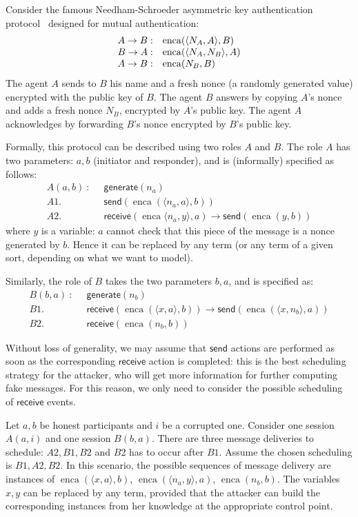 \documentclass[acmtocl,acmnow]{acmtrans2m}
\newcommand{\pair}[2]{\langle{#1},{#2}\rangle}
\newcommand{\enca}{\operatorname{enca}}
\newcommand{\pub}[1]{#1}
\newcommand{\new}{\mathsf{generate}}
\newcommand{\send}{\mathsf{send}}
\newcommand{\recv}{\mathsf{receive}}
\begin{document}
\begin{example}\label{ex:ns}
Consider the famous Needham-Schroeder asymmetric key
authentication protocol~\cite{NS78} designed for mutual authentication:
\[
\begin{array}{r@{\quad}l}
A\rightarrow B: & \enca(\pair{N_A}{A},\pub{B})\\
B\rightarrow A: & \enca(\pair{N_A}{N_B},\pub{A})\\
A\rightarrow B: & \enca(N_B,\pub{B})
\end{array}
\]
The agent $A$ sends to $B$ his name and a fresh nonce (a randomly generated value) encrypted with the public
key of $B$. The agent $B$ answers by copying $A$'s nonce and adds a fresh nonce $N_B$, encrypted by $A$'s
public key. The agent $A$ acknowledges by forwarding $B$'s nonce encrypted by $B$'s public key. 

Formally, this protocol can be described using two roles $A$ and $B$.
The role $A$ has two parameters: $a,b$ (initiator and responder), and
is (informally) specified as follows:
\[
\begin{array}{rl}
A(a,b)\: :\;\; & \new(n_a)\\
A1. & \send(\enca(\pair{n_a}{a},\pub{b}))\\
A2. & \recv(\enca{\pair{n_a}{y}},\pub{a}) \rightarrow \send(\enca(y,\pub{b}))
\end{array}
\]
where $y$ is a variable: $a$ cannot check that this piece of the message is
a nonce generated by $b$. Hence it can be replaced by any term (or any term
of a given sort, depending on what we want to model). 

Similarly, the role of $B$ takes the two parameters $b,a$, and is specified as:
\[
\begin{array}{rl}
B(b,a)\: :\;\; & \new(n_b)\\
B1.& \recv(\enca(\pair{x}{a},\pub{b})) \rightarrow \send(\enca(\pair{x}{n_b},\pub{a}))\\
B2. & \recv(\enca(n_b,\pub{b}))
\end{array}
\]






Without loss of generality, we may assume that $\send$ actions are
performed as soon as the corresponding $\recv$ action is completed:
this is the best scheduling strategy for the attacker, who will get more
information for further computing fake messages. For this reason, we only need
to consider the possible scheduling of $\recv$ events.


Let $a,b$ be honest participants and $i$ be a corrupted one.
Consider one session $A(a,i)$ and one session $B(b,a)$.
There are three message deliveries to schedule: $A2,B1,B2$ and $B2$ has to
occur after $B1$. Assume the chosen scheduling is $B1,A2,B2$.
In this scenario, the possible sequences of message  delivery are
instances of $\enca(\pair{x}{a},\pub{b})$, $\enca(\pair{n_a}{y},\pub{a})$,
$\enca(n_b,\pub{b})$.  The variables $x,y$ can be replaced by any term, provided that
the attacker can build the corresponding instances from her knowledge at
the appropriate control point.



\end{example}
\end{document}
